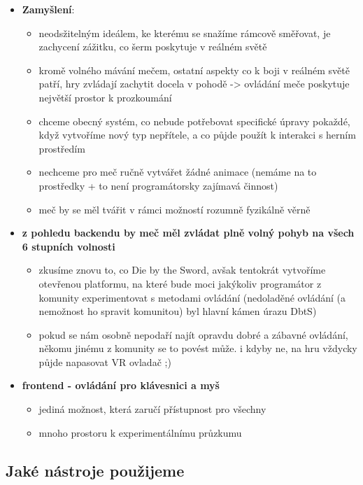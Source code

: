 \begin{itemize}
    \item \textbf{Zamyšlení}:
        \begin{itemize}
            \item neodsžitelným ideálem, ke kterému se snažíme rámcově směřovat, je zachycení zážitku, co šerm poskytuje v reálném světě
            \item kromě volného mávání mečem, ostatní aspekty co k boji v reálném světě patří, hry zvládají zachytit docela v pohodě -> ovládání meče poskytuje největší prostor k prozkoumání
            \item chceme obecný systém, co nebude potřebovat specifické úpravy pokaždé, když vytvoříme nový typ nepřítele, a co půjde použít k interakci s herním prostředím
            \item nechceme pro meč ručně vytvářet žádné animace (nemáme na to prostředky + to není programátorsky zajímavá činnost)
            \item meč by se měl tvářit v rámci možností rozumně fyzikálně věrně 
        \end{itemize}
    
    \item \textbf{z pohledu backendu by meč měl zvládat plně volný pohyb na všech 6 stupních volnosti}
        \begin{itemize}
            \item zkusíme znovu to, co Die by the Sword, avšak tentokrát vytvoříme otevřenou platformu, na které bude moci jakýkoliv programátor z komunity experimentovat s metodami ovládání (nedoladěné ovládání (a nemožnost ho spravit komunitou) byl hlavní kámen úrazu DbtS)
            \item pokud se nám osobně nepodaří najít opravdu dobré a zábavné ovládání, někomu jinému z komunity se to povést může. i kdyby ne, na hru vždycky půjde napasovat VR ovladač ;)
        \end{itemize}
    \item \textbf{frontend - ovládání pro klávesnici a myš}
        \begin{itemize}
            \item jediná možnost, která zaručí přístupnost pro všechny
            \item mnoho prostoru k experimentálnímu průzkumu
        \end{itemize}
\end{itemize}

\subsection{Jaké nástroje použijeme}

